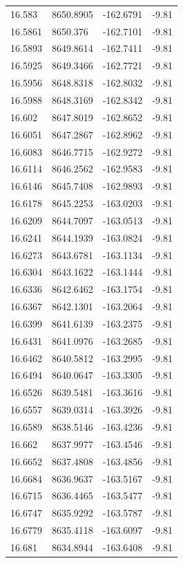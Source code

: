 \begin{table}[H]
\begin{tabular}{llll}
16.583 & 8650.8905 & -162.6791 & -9.81 \\
16.5861 & 8650.376 & -162.7101 & -9.81 \\
16.5893 & 8649.8614 & -162.7411 & -9.81 \\
16.5925 & 8649.3466 & -162.7721 & -9.81 \\
16.5956 & 8648.8318 & -162.8032 & -9.81 \\
16.5988 & 8648.3169 & -162.8342 & -9.81 \\
16.602 & 8647.8019 & -162.8652 & -9.81 \\
16.6051 & 8647.2867 & -162.8962 & -9.81 \\
16.6083 & 8646.7715 & -162.9272 & -9.81 \\
16.6114 & 8646.2562 & -162.9583 & -9.81 \\
16.6146 & 8645.7408 & -162.9893 & -9.81 \\
16.6178 & 8645.2253 & -163.0203 & -9.81 \\
16.6209 & 8644.7097 & -163.0513 & -9.81 \\
16.6241 & 8644.1939 & -163.0824 & -9.81 \\
16.6273 & 8643.6781 & -163.1134 & -9.81 \\
16.6304 & 8643.1622 & -163.1444 & -9.81 \\
16.6336 & 8642.6462 & -163.1754 & -9.81 \\
16.6367 & 8642.1301 & -163.2064 & -9.81 \\
16.6399 & 8641.6139 & -163.2375 & -9.81 \\
16.6431 & 8641.0976 & -163.2685 & -9.81 \\
16.6462 & 8640.5812 & -163.2995 & -9.81 \\
16.6494 & 8640.0647 & -163.3305 & -9.81 \\
16.6526 & 8639.5481 & -163.3616 & -9.81 \\
16.6557 & 8639.0314 & -163.3926 & -9.81 \\
16.6589 & 8638.5146 & -163.4236 & -9.81 \\
16.662 & 8637.9977 & -163.4546 & -9.81 \\
16.6652 & 8637.4808 & -163.4856 & -9.81 \\
16.6684 & 8636.9637 & -163.5167 & -9.81 \\
16.6715 & 8636.4465 & -163.5477 & -9.81 \\
16.6747 & 8635.9292 & -163.5787 & -9.81 \\
16.6779 & 8635.4118 & -163.6097 & -9.81 \\
16.681 & 8634.8944 & -163.6408 & -9.81 \\

\end{tabular}
\end{table}
